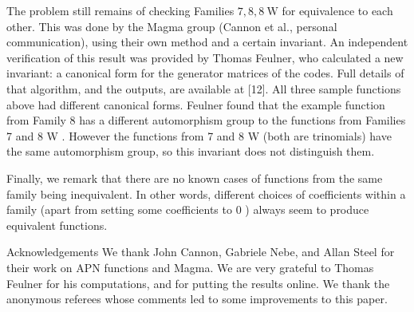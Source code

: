 \documentclass[10pt]{article}
\begin{document}
The problem still remains of checking Families $7,8,8 \mathrm{~W}$ for equivalence to each other. This was done by the Magma group (Cannon et al., personal communication), using their own method and a certain invariant. An independent verification of this result was provided by Thomas Feulner, who calculated a new invariant: a canonical form for the generator matrices of the codes. Full details of that algorithm, and the outputs, are available at [12]. All three sample functions above had different canonical forms. Feulner found that the example function from Family 8 has a different automorphism group to the functions from Families 7 and 8 W . However the functions from 7 and 8 W (both are trinomials) have the same automorphism group, so this invariant does not distinguish them.

Finally, we remark that there are no known cases of functions from the same family being inequivalent. In other words, different choices of coefficients within a family (apart from setting some coefficients to 0 ) always seem to produce equivalent functions.

Acknowledgements We thank John Cannon, Gabriele Nebe, and Allan Steel for their work on APN functions and Magma. We are very grateful to Thomas Feulner for his computations, and for putting the results online. We thank the anonymous referees whose comments led to some improvements to this paper.
\end{document}
